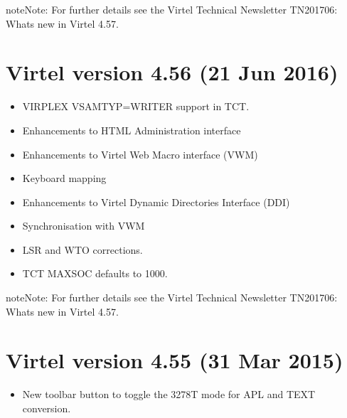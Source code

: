 \documentclass[letterpaper,10pt,english]{sphinxmanual}
\begin{document}
\begin{sphinxadmonition}{note}{Note:}
For further details see the Virtel Technical Newsletter TN201706: Whats new in Virtel 4.57.
\end{sphinxadmonition}


\section{Virtel version 4.56 (21 Jun 2016)}
\label{\detokenize{Installation_Guide:virtel-version-4-56-21-jun-2016}}
\begin{itemize}
\item {} 
VIRPLEX VSAMTYP=WRITER support in TCT.

\item {} 
Enhancements to HTML Administration interface

\item {} 
Enhancements to Virtel Web Macro interface (VWM)

\item {} 
Keyboard mapping

\item {} 
Enhancements to Virtel Dynamic Directories Interface (DDI)

\item {} 
Synchronisation with VWM

\end{itemize}

\begin{itemize}
\item {} 
LSR and WTO corrections.

\item {} 
TCT MAXSOC defaults to 1000.

\end{itemize}

\begin{sphinxadmonition}{note}{Note:}
For further details see the Virtel Technical Newsletter TN201706: Whats new in Virtel 4.57.
\end{sphinxadmonition}


\section{Virtel version 4.55 (31 Mar 2015)}
\label{\detokenize{Installation_Guide:virtel-version-4-55-31-mar-2015}}
\begin{itemize}
\item {} 
New toolbar button to toggle the 3278T mode for APL and TEXT conversion.

\end{itemize}
\end{document}
